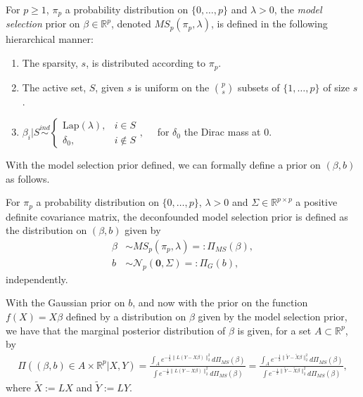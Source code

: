 \documentclass[11pt]{article}
\newcommand{\R}{\mathbb{R}}
\newcommand{\N}{\mathcal{N}}
\newcommand{\Pims}{\Pi_{MS}}
\newcommand{\Pig}{\Pi_{G}}
\newcommand{\LX}{\tilde{X}}
\newcommand{\LY}{\tilde{Y}}
\begin{document}
  \begin{definition}\label{model_selection_prior}
 For $p\geq 1$, $\pi_p$ a probability distribution on $\{0, \dots, p\}$ and $\lambda > 0$, the \textit{model selection} prior on $\beta \in \R^p$, denoted $MS_p(\pi_p, \lambda)$, is defined in the following hierarchical manner:
 	\begin{enumerate}
 		\item The sparsity, $s$, is distributed according to $\pi_p$.
 		\item The active set, $S$, given $s$ is uniform on the ${p}\choose {s}$ subsets of $\{1,\dots,p\}$ of size $s$.
 		\item $\beta_i | S \overset{ind}{\sim} \begin{cases}
 			\text{Lap}(\lambda),& i \in S \\
 			\delta_0,& i \notin S
 		\end{cases},\quad$  for $\delta_0$ the Dirac mass at 0.
 	\end{enumerate}
\end{definition}
With the model selection prior defined, we can formally define a prior on $(\beta, b)$ as follows.
\begin{definition}\label{def:decon_model_selection_prior}
	For $\pi_p$ a probability distribution on $\{0, \dots, p\}$, $\lambda > 0$ and $\Sigma \in \R^{p \times p}$ a positive definite covariance matrix, the deconfounded model selection prior is defined as the distribution on $(\beta, b)$ given by
	\begin{align*}
		\beta &\sim MS_p(\pi_p, \lambda) =: \Pims(\beta),\\
		b &\sim \N_p(\mathbf{0}, \Sigma) =: \Pig(b),
	\end{align*}
	independently.
\end{definition}

With the Gaussian prior on $b$, and now with the prior on the function $f(X) = X\beta$  defined by a distribution on $\beta$ given by the model selection prior, we have that the marginal posterior distribution of $\beta$ is given, for a set $A \subset \R^p$, by
\begin{align}
	\Pi((\beta, b) \in A \times \R^p | X, Y) = \frac{\int_A e^{-\frac{1}{2}\|L(Y - X\beta)\|_2^2} d\Pims(\beta) }{\int e^{-\frac{1}{2}\|L(Y - X\beta)\|_2^2} d\Pims(\beta)}  = \frac{\int_A e^{-\frac{1}{2}\|\LY - \LX\beta\|_2^2} d\Pims(\beta) }{\int e^{-\frac{1}{2}\|\tilde{Y} - \LX\beta\|_2^2} d\Pims(\beta)}, \label{eq:marginal_posterior_form_linear}
\end{align}
where $\LX := L X$ and $\LY := L Y$.
\end{document}
